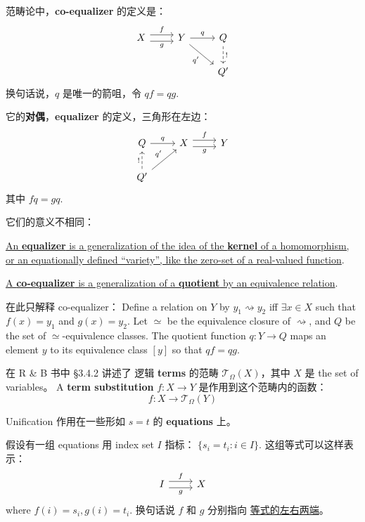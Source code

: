 \documentclass[12pt, orivec]{article}
\begin{document}
范畴论中，\textbf{co-equalizer} 的定义是：
\begin{equation}
\begin{tikzcd}
X \ar[r,shift left=.75ex,"f"]
  \ar[r,shift right=.75ex,swap,"g"]
&
Y \ar[r,"q"] \ar[dr,swap,"q'"]
&
Q \ar[d,densely dashed, "!"]
\\
& & Q'
\end{tikzcd}
\end{equation}
换句话说，$q$ 是唯一的箭咀，令 $qf = qg$.

它的\textbf{对偶}，\textbf{equalizer} 的定义，三角形在左边：
\begin{equation}
\begin{tikzcd}
Q \ar[r,"q"]
&
X \ar[r,shift left=.75ex,"f"]
  \ar[r,shift right=.75ex,swap,"g"]
&
Y
\\
Q' \ar[ur,"q'"]
   \ar[u,densely dashed, "!"]
 & &
\end{tikzcd}
\end{equation}
其中 $fq = gq$.

它们的意义不相同：

\uline{An \textbf{equalizer} is a generalization of the idea of the \textbf{kernel} of a homomorphism, or an equationally defined ``variety'', like the zero-set of a real-valued function}.

\uline{A \textbf{co-equalizer} is a generalization of a \textbf{quotient} by an equivalence relation}.

在此只解释 co-equalizer：  Define a relation on $Y$ by $y_1 \rightsquigarrow y_2$ iff $\exists x \in X$ such that $f(x) = y_1$ and $g(x) = y_2$.  Let $\simeq$ be the equivalence closure of $\rightsquigarrow$, and $Q$ be the set of $\simeq$-equivalence classes.  The quotient function $q: Y \rightarrow Q$ maps an element $y$ to its equivalence class $[y]$ so that $qf = qg$.

在 R \& B 书中 \S 3.4.2 讲述了 逻辑 \textbf{terms} 的范畴 $\mathcal{T}_{\Omega}(X)$，其中 $X$ 是 the set of variables。  A \textbf{term substitution} $f: X \rightarrow Y$ 是作用到这个范畴内的函数：
\begin{equation}
f: X \rightarrow \mathcal{T}_{\Omega}(Y)
\end{equation}

Unification 作用在一些形如 $s = t$ 的 \textbf{equations} 上。

假设有一组 equations 用 index set $I$ 指标： $\{ s_i = t_i : i \in I \}$.  这组等式可以这样表示：
\begin{equation}
\begin{tikzcd}
I \ar[r,shift left=.75ex,"f"]
  \ar[r,shift right=.75ex,swap,"g"]
& X
\end{tikzcd}
\end{equation}
where $f(i) = s_i, g(i) = t_i$.  换句话说 $f$ 和 $g$ 分别指向 \uline{等式的左右两端}。
\end{document}
